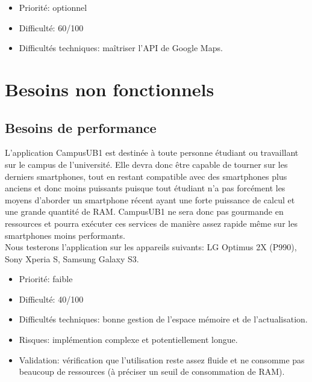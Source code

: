 \documentclass [pdftex,12pt] {report}
\begin{document}
\begin{itemize}
\renewcommand{\labelitemi}{$\bullet$}
\item Priorité: optionnel
\item Difficulté: 60/100
\item Difficultés techniques: maîtriser l'API de Google Maps.
\end{itemize}



\section{Besoins non fonctionnels}
\subsection{Besoins de performance}
L'application CampusUB1 est destinée à toute personne étudiant ou travaillant sur le campus de l'université. Elle devra donc être capable de tourner sur les derniers smartphones, tout en restant compatible avec des smartphones plus anciens et donc moins puissants puisque tout étudiant n'a pas forcément les moyens d'aborder un smartphone récent ayant une forte puissance de calcul et une grande quantité de RAM. CampusUB1 ne sera donc pas gourmande en ressources et pourra exécuter ces services de manière assez rapide même sur les smartphones moins performants.\\
Nous testerons l'application sur les appareils suivants: LG Optimus 2X (P990), Sony Xperia S, Samsung Galaxy S3.\\

\begin{itemize}
\renewcommand{\labelitemi}{$\bullet$}
\item Priorité: faible
\item Difficulté: 40/100
\item Difficultés techniques: bonne gestion de l'espace mémoire et de l'actualisation.
\item Risques: implémention complexe et potentiellement longue.
\item Validation: vérification que l'utilisation reste assez fluide et ne consomme pas beaucoup de ressources (à préciser un seuil de consommation de RAM).
\end{itemize}  
\end{document}
